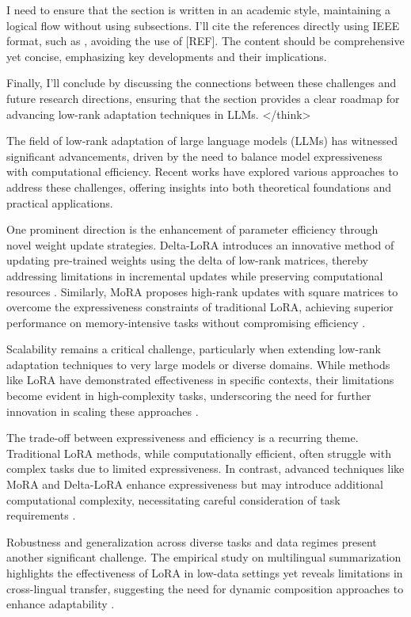 \documentclass[conference]{IEEEtran}
\begin{document}
I need to ensure that the section is written in an academic style, maintaining a logical flow without using subsections. I'll cite the references directly using IEEE format, such as \cite{bX}, avoiding the use of [REF]. The content should be comprehensive yet concise, emphasizing key developments and their implications.

Finally, I'll conclude by discussing the connections between these challenges and future research directions, ensuring that the section provides a clear roadmap for advancing low-rank adaptation techniques in LLMs.
</think>

The field of low-rank adaptation of large language models (LLMs) has witnessed significant advancements, driven by the need to balance model expressiveness with computational efficiency. Recent works have explored various approaches to address these challenges, offering insights into both theoretical foundations and practical applications.

One prominent direction is the enhancement of parameter efficiency through novel weight update strategies. Delta-LoRA introduces an innovative method of updating pre-trained weights using the delta of low-rank matrices, thereby addressing limitations in incremental updates while preserving computational resources \cite{bX}. Similarly, MoRA proposes high-rank updates with square matrices to overcome the expressiveness constraints of traditional LoRA, achieving superior performance on memory-intensive tasks without compromising efficiency \cite{bX}.

Scalability remains a critical challenge, particularly when extending low-rank adaptation techniques to very large models or diverse domains. While methods like LoRA have demonstrated effectiveness in specific contexts, their limitations become evident in high-complexity tasks, underscoring the need for further innovation in scaling these approaches \cite{bX}.

The trade-off between expressiveness and efficiency is a recurring theme. Traditional LoRA methods, while computationally efficient, often struggle with complex tasks due to limited expressiveness. In contrast, advanced techniques like MoRA and Delta-LoRA enhance expressiveness but may introduce additional computational complexity, necessitating careful consideration of task requirements \cite{bX}.

Robustness and generalization across diverse tasks and data regimes present another significant challenge. The empirical study on multilingual summarization highlights the effectiveness of LoRA in low-data settings yet reveals limitations in cross-lingual transfer, suggesting the need for dynamic composition approaches to enhance adaptability \cite{bX}.
\end{document}
